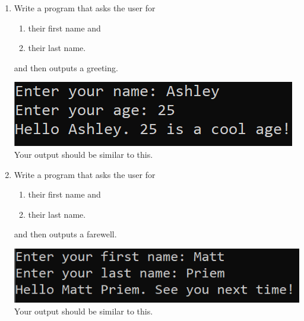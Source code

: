 \documentclass{article}
\begin{document}
\begin{enumerate}
\item Write a program that asks the user for \\
	\begin{minipage}{0.5\textwidth}
	\vspace*{-0.5em}
		\begin{enumerate}  \setlength\itemsep{-0.3em}
			\item their first name and
			\item their last name.  
		\end{enumerate} \vspace*{-1ex}
	and then outputs a greeting.
	\end{minipage}
	\begin{minipage}{0.5\textwidth}
		\centering
		\includegraphics[scale=0.95]{./imgs/outputGreetingWithAge.png}\\
		Your output should be similar to this.
	\end{minipage}





	\item 
		Write a program that asks the user for \\
		\begin{minipage}{0.5\textwidth}
		\vspace*{-0.5em}
			\begin{enumerate}  \setlength\itemsep{-0.3em}
				\item their first name and
				\item their last name.  
			\end{enumerate} \vspace*{-1ex}
		and then outputs a farewell.
		\end{minipage}
		\begin{minipage}{0.5\textwidth}
			\centering
			\includegraphics[scale=0.9]{./imgs/outputFarewell.png}\\
			Your output should be similar to this.
		\end{minipage}




\end{enumerate}
\end{document}
